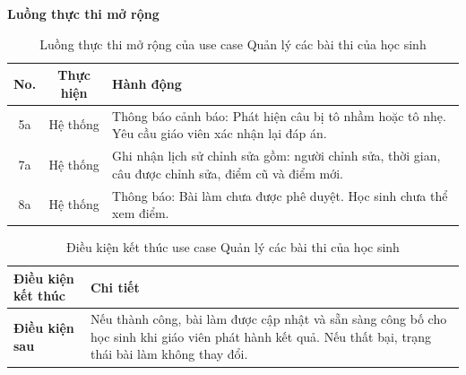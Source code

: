 ﻿\documentclass[../DoAn.tex]{subfiles}
\begin{document}
\noindent\textbf{Luồng thực thi mở rộng}
\begin{table}[H]
\centering
\begin{tabular}{|c|c|p{9cm}|}
\hline
\textbf{No.} & \textbf{Thực hiện} & \textbf{Hành động} \\ \hline
5a & Hệ thống & Thông báo cảnh báo: Phát hiện câu bị tô nhầm hoặc tô nhẹ. Yêu cầu giáo viên xác nhận lại đáp án. \\ \hline
7a & Hệ thống & Ghi nhận lịch sử chỉnh sửa gồm: người chỉnh sửa, thời gian, câu được chỉnh sửa, điểm cũ và điểm mới. \\ \hline
8a & Hệ thống & Thông báo: Bài làm chưa được phê duyệt. Học sinh chưa thể xem điểm. \\ \hline
\end{tabular}
\caption{Luồng thực thi mở rộng của use case Quản lý các bài thi của học sinh}
\label{table:appendix:B.3_ext}
\end{table}
\begin{table}[H]
\centering
\begin{tabular}{|p{4cm}|p{10cm}|}
\hline
\textbf{Điều kiện kết thúc} & \textbf{Chi tiết} \\ \hline
\textbf{Điều kiện sau} & Nếu thành công, bài làm được cập nhật và sẵn sàng công bố cho học sinh khi giáo viên phát hành kết quả. Nếu thất bại, trạng thái bài làm không thay đổi. \\ \hline
\end{tabular}
\caption{Điều kiện kết thúc use case Quản lý các bài thi của học sinh}
\label{table:appendix:B.3_post}
\end{table}
\end{document}
